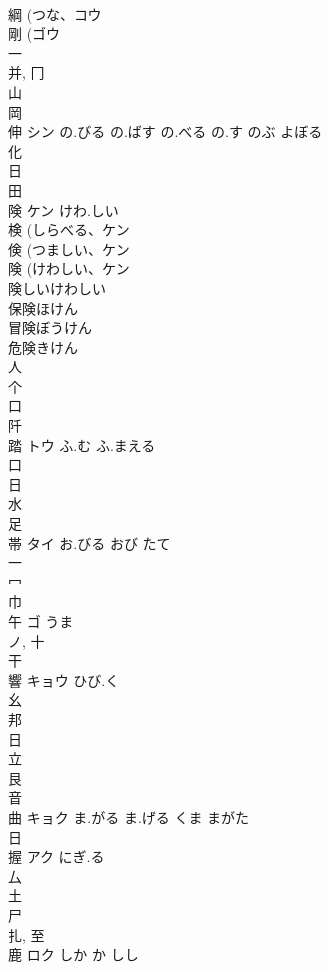 \documentclass[8pt]{extreport}
\begin{document}
\begin{CJK}{UTF8}{min}
\\	綱 (つな、コウ 
\\	剛 (ゴウ 
\\	一 
\\	并, 冂 
\\	山 
\\	岡 
\\	伸	シン	の.びる の.ばす の.べる の.す のぶ よぼる	
\\	化 
\\	日 
\\	田 
\\	険	ケン	けわ.しい	
\\	検 (しらべる、ケン 
\\	倹 (つましい、ケン 
\\	険 (けわしい、ケン 
\\	険しいけわしい
\\	保険ほけん
\\	冒険ぼうけん
\\	危険きけん
\\	人 
\\	个 
\\	口 
\\	阡	
\\	踏	トウ	ふ.む ふ.まえる	
\\	口 
\\	日 
\\	水 
\\	足 
\\	帯	タイ	お.びる おび たて	
\\	一 
\\	冖 
\\	巾 
\\	午	ゴ	うま	
\\	ノ, 十 
\\	干 
\\	響	キョウ	ひび.く	
\\	幺 
\\	邦 
\\	日 
\\	立 
\\	艮 
\\	音 
\\	曲	キョク	ま.がる ま.げる くま まがた	
\\	日 
\\	握	アク	にぎ.る	
\\	厶 
\\	土 
\\	尸 
\\	扎, 至 
\\	鹿	ロク	しか か しし	

\end{CJK}
\end{document}
